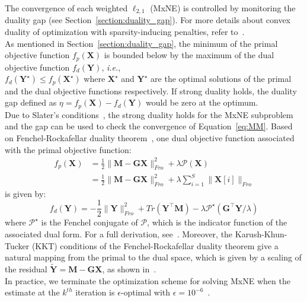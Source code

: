 The convergence of each weighted $\ell_{2,1}$ (MxNE) is controlled by monitoring the duality gap (see Section~\ref{section:duality_gap}). For more details about convex duality of optimization with sparsity-inducing penalties, refer to~\cite{bach2012optimization}.\\
As mentioned in Section~\ref{section:duality_gap}, the minimum of the primal objective function $f_p(\mathbf{X})$ is bounded below by the maximum of the dual objective function $f_d(\mathbf{Y})$, \textit{i.e.},\\
$f_d(\mathbf{Y}^\star)\leq f_p(\mathbf{X}^\star)$ where $\mathbf{X}^\star$ and $\mathbf{Y}^\star$ are the optimal solutions of the primal and the dual objective functions respectively. If strong duality holds, the duality gap defined as $\eta=f_p(\mathbf{X})-f_d(\mathbf{Y})$ would be zero at the optimum.\\
Due to Slater's conditions~\cite{Boyd_Vandenberghe04}, the strong duality holds for the MxNE subproblem and the gap can be used to check the convergence of Equation~\eqref{eq:MM}. Based on Fenchel-Rockafellar duality theorem~\cite{rockafellar:1997}, one dual objective function associated with the primal objective function:
\begin{equation}
\begin{split}
f_p(\mathbf{X}) & = \frac{1}{2}\|\mathbf{M}-\mathbf{GX}\|_{Fro}^2+\lambda\mathcal{P}(\mathbf{X}) \\
& = \frac{1}{2}\|\mathbf{M}-\mathbf{GX}\|_{Fro}^2+\lambda\sum_{i=1}^S\|\mathbf{X}[i]\|_{Fro}
\end{split}
\end{equation}
is given by:
\begin{equation}
f_d(\mathbf{Y})=-\frac{1}{2}\|\mathbf{Y}\|_{Fro}^2+Tr(\mathbf{Y}^\top\mathbf{M})-\lambda\mathcal{P}^\star(\mathbf{G}^\top\mathbf{Y}/\lambda)
\end{equation}
where $\mathcal{P}^\star$ is the Fenchel conjugate of $\mathcal{P}$, which is the indicator function of the associated dual form. For a full derivation, see~\cite{Gramfort_Kowalski_Hamalainen12}. Moreover, the Karush-Khun-Tucker (KKT) conditions of the Fenchel-Rockafellar duality theorem give a natural mapping from
the primal to the dual space, which is given by a scaling of the residual $\tilde{\mathbf{Y}}=\mathbf{M}-\mathbf{GX}$, as shown in~\cite{Gramfort_Kowalski_Hamalainen12}.\\
In practice, we terminate the optimization scheme for solving MxNE when the estimate at the $k^{th}$ iteration is $\epsilon$-optimal with $\epsilon=10^{-6}$~\cite{strohmeier-etal:16}.\\


